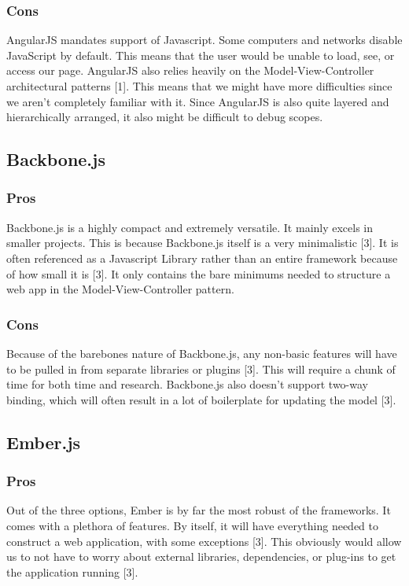 \documentclass[onecolumn, draftclsnofoot,10pt, compsoc]{IEEEtran}
\begin{document}
    \subsubsection{Cons}
    AngularJS mandates support of Javascript. Some computers and networks disable JavaScript by default. This means that the user would be unable to load, see, or access our page. AngularJS also relies heavily on the Model-View-Controller architectural patterns [1]. This means that we might have more difficulties since we aren’t completely familiar with it. Since AngularJS is also quite layered and hierarchically arranged, it also might be difficult to debug scopes.
		
	\subsection{Backbone.js}	
	\subsubsection{Pros}
		Backbone.js is a highly compact and extremely versatile. It mainly excels in smaller projects. This is because Backbone.js itself is a very minimalistic [3]. It is often referenced as a Javascript Library rather than an entire framework because of how small it is [3]. It only contains the bare minimums needed to structure a web app in the Model-View-Controller pattern.
    \subsubsection{Cons}
    Because of the barebones nature of Backbone.js, any non-basic features will have to be pulled in from separate libraries or plugins [3]. This will require a chunk of time for both time and research. Backbone.js also doesn’t support two-way binding, which will often result in a lot of boilerplate for updating the model [3].
		
	\subsection{Ember.js}
	
		\subsubsection{Pros}
		Out of the three options, Ember is by far the most robust of the frameworks. It comes with a plethora of features. By itself, it will have everything needed to construct a web application, with some exceptions [3]. This obviously would allow us to not have to worry about external libraries, dependencies, or plug-ins to get the application running [3].
\end{document}
